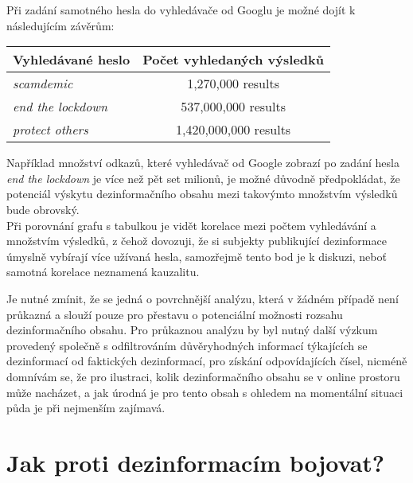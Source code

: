 Při zadání samotného hesla do vyhledávače od Googlu je možné dojít k následujícím závěrům:\\

\begin{centering}
\begin{tabular}{l|c}
 \textbf{Vyhledávané heslo} & \textbf{Počet vyhledaných výsledků} \\ 
\hline
\hline
 \textit{scamdemic} & 1,270,000 results \\  
 \textit{end the lockdown} & 537,000,000 results \\
 \textit{protect others} & 1,420,000,000 results \\
\hline
\hline    
\end{tabular}
  \label{tbl:odkaz}
\end{centering}
\vspace*{5mm}

Například množství odkazů, které vyhledávač od Google zobrazí po zadání hesla \textit{end the lockdown} je více než pět set milionů, je možné důvodně předpokládat, že potenciál výskytu dezinformačního obsahu mezi takovýmto množstvím výsledků bude obrovský.\\

Při porovnání grafu s tabulkou je vidět korelace mezi počtem vyhledávání a množstvím výsledků, z čehož dovozuji, že si subjekty publikující dezinformace úmyslně vybírají více užívaná hesla, samozřejmě tento bod je k diskuzi, neboť samotná korelace neznamená kauzalitu.\\

\begin{framed}
{\small Je nutné zmínit, že se jedná o povrchnější analýzu, která v žádném případě není průkazná a slouží pouze pro přestavu o potenciální možnosti rozsahu dezinformačního obsahu. Pro průkaznou analýzu by byl nutný další výzkum provedený společně s odfiltrováním důvěryhodných informací týkajících se dezinformací od faktických dezinformací, pro získání odpovídajících čísel, nicméně domnívám se, že pro ilustraci, kolik dezinformačního obsahu se v online prostoru může nacházet, a jak úrodná je pro tento obsah s ohledem na momentální situaci půda je při nejmenším zajímavá.}
\end{framed}

\newpage

\section{Jak proti dezinformacím bojovat?}

